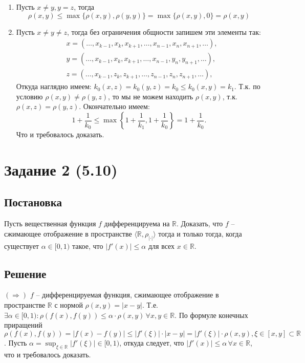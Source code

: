 \documentclass[14pt, a4paper, titlepage, fleqn]{extarticle}
\begin{document}
        \begin{enumerate}
            \item Пусть \( x \neq y, y = z \), тогда
            \[
                \rho(x, y) \leq \max \{ \rho(x, y), \rho(y, y) \} = \max \{ \rho(x, y), 0 \} = \rho(x, y)
            \]

            \item Пусть \( x \neq y \neq z \), тогда без ограничения общности запишем эти элементы так:
            \[
                \begin{split}
                    & x = (\dots, x_{k-1}, x_{k}, x_{k+1}, \dots, x_{n-1}, x_{n}, x_{n+1}, \dots), \\
                    & y = (\dots, x_{k-1}, x_{k}, x_{k+1}, \dots, x_{n-1}, y_{n}, y_{n+1}, \dots), \\
                    & z = (\dots, x_{k-1}, z_{k}, z_{k+1}, \dots, z_{n-1}, z_{n}, z_{n+1}, \dots),
                \end{split}
            \]
            Откуда наглядно имеем: \( k_0(x,z) = k_0(y,z) = k_0 \leq k_0(x,y) = k_1 \). Т.к. по условию \( \rho(x, y) \neq \rho(y,z) \), то мы не можем находить \( \rho(x, y) \), т.к. \( \rho(x, z) = \rho(y,z) \). Окончательно имеем:
            \[
                1 + \frac{1}{k_0} \leq \max \left\{ 1 + \frac{1}{k_1}, 1 + \frac{1}{k_0} \right\} = 1 + \frac{1}{k_0}.
            \]
            Что и требовалось доказать.
            
        \end{enumerate}


    

    \pagebreak

    \section{Задание 2 (5.10)}

        \subsection{Постановка}
        Пусть вещественная функция \( f \) дифференцируема на \( \mathbb{R} \). Доказать, что \(f\) -- сжимающее отображение в пространстве \( \langle \mathbb{R}, \rho_{|\cdot|} \rangle \) тогда и только тогда, когда существует \( \alpha \in [0, 1) \) такое, что \( |f'(x)| \leq \alpha \) для всех \( x \in \mathbb{R} \).
        
        \subsection{Решение}
        \( (\Rightarrow) \) \( f \) -- дифференцируемая функция, сжимающее отображение в пространстве \( \mathbb{R} \) с нормой \( \rho(x, y) = |x - y| \). Т.е. \( \exists \alpha \in [0, 1): \rho\left(f(x), f(y)\right) \leq \alpha \cdot \rho(x, y) \, \forall x,y \in \mathbb{R} \). По формуле конечных приращений \( \rho\left(f(x), f(y)\right) = |f(x) - f(y)| \leq |f'(\xi)| \cdot |x - y| = |f'(\xi)| \cdot \rho(x, y), \xi \in [x, y]\subset \mathbb{R} \). Пусть \( \alpha = \sup_{\xi \in \mathbb{R}} |f'(\xi)| \in [0, 1) \), откуда следует, что \( |f'(x)| \leq \alpha \, \forall x \in \mathbb{R} \), что и требовалось доказать.
\end{document}
